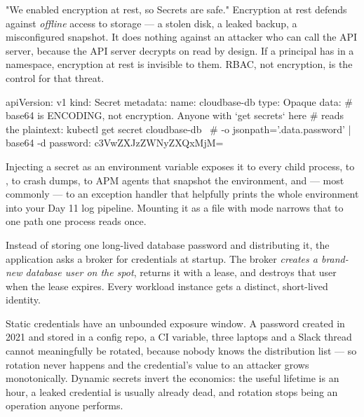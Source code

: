 \begin{misconception}
"We enabled encryption at rest, so Secrets are safe." Encryption at rest defends against \emph{offline} access to storage --- a stolen disk, a leaked backup, a misconfigured snapshot. It does nothing against an attacker who can call the API server, because the API server decrypts on read by design. If a principal has  in a namespace, encryption at rest is invisible to them. RBAC, not encryption, is the control for that threat.
\end{misconception}

\begin{k8sbox}
apiVersion: v1
kind: Secret
metadata:
  name: cloudbase-db
type: Opaque
data:
  # base64 is ENCODING, not encryption. Anyone with `get secrets` here
  # reads the plaintext: kubectl get secret cloudbase-db \
  #   -o jsonpath='{.data.password}' | base64 -d
  password: c3VwZXJzZWNyZXQxMjM=
\end{k8sbox}

\begin{secwarn}
Injecting a secret as an environment variable exposes it to every child process, to , to crash dumps, to APM agents that snapshot the environment, and --- most commonly --- to an exception handler that helpfully prints the whole environment into your Day 11 log pipeline. Mounting it as a file with mode  narrows that to one path one process reads once.
\end{secwarn}


 Instead of storing one long-lived database password and distributing it, the application asks a broker for credentials at startup. The broker \emph{creates a brand-new database user on the spot}, returns it with a lease, and destroys that user when the lease expires. Every workload instance gets a distinct, short-lived identity.

 Static credentials have an unbounded exposure window. A password created in 2021 and stored in a config repo, a CI variable, three laptops and a Slack thread cannot meaningfully be rotated, because nobody knows the distribution list --- so rotation never happens and the credential's value to an attacker grows monotonically. Dynamic secrets invert the economics: the useful lifetime is an hour, a leaked credential is usually already dead, and rotation stops being an operation anyone performs.

